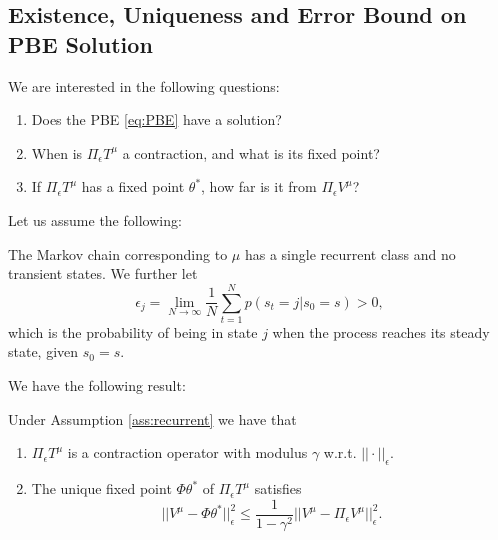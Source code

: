\subsection{Existence, Uniqueness and Error Bound on PBE Solution}
We are interested in the following questions:
\begin{enumerate}
\item Does the PBE \eqref{eq:PBE} have a solution?
\item When is $\Pi_\epsilon T^\mu$ a contraction, and what is its fixed point?
\item If $\Pi_\epsilon T^\mu$ has a fixed point $\theta^*$, how far is it from $\Pi_\epsilon V^\mu$?
\end{enumerate}
Let us assume the following:
\begin{assumption}\label{ass:recurrent}The Markov chain corresponding to $\mu$ has a single recurrent class and no transient states. We further let
$$\epsilon_j = \lim_{N\rightarrow \infty} \frac{1}{N} \sum_{t=1}^N p(s_t=j|s_0=s)>0,$$
which is the probability of being in state $j$ when the process reaches its steady state, given $s_0=s$.
\end{assumption}
We have the following result:
\begin{proposition}\label{prop:PBE_contraction} Under Assumption \ref{ass:recurrent} we have that
\begin{enumerate}
\item $\Pi_\epsilon T^\mu$ is a contraction operator with modulus $\gamma$ w.r.t. $||\cdot||_\epsilon$.
\item The unique fixed point $\Phi \theta^*$ of $\Pi_\epsilon T^\mu$ satisfies
$$||V^\mu - \Phi \theta^*||_\epsilon^2 \le \frac{1}{1-\gamma^2}||V^\mu-\Pi_\epsilon V^\mu||_\epsilon^2.$$
\end{enumerate}
\end{proposition}
